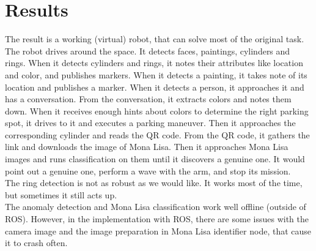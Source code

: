 \documentclass[a4paper,
  twoside, %
  headlines=2.1 %
  ]{scrartcl}
\begin{document}
\newpage

\section{Results}
The result is a working (virtual) robot, that can solve most of the original task. 
\\
The robot drives around the space. It detects faces, paintings, cylinders and rings. When it detects cylinders and rings, it notes their attributes like location and color, and publishes markers. When it detects a painting, it takes note of its location and publishes a marker. When it detects a person, it approaches it and has a conversation. From the conversation, it extracts colors and notes them down. When it receives enough hints about colors to determine the right parking spot, it drives to it and executes a parking maneuver. Then it approaches the corresponding cylinder and reads the QR code. From the QR code, it gathers the link and downloads the image of Mona Lisa. Then it approaches Mona Lisa images and runs classification on them until it discovers a genuine one. It would point out a genuine one, perform a wave with the arm, and stop its mission.
\\
The ring detection is not as robust as we would like. It works most of the time, but sometimes it still acts up. 
\\
The anomaly detection and Mona Lisa classification work well offline (outside of ROS). However, in the implementation with ROS, there are some issues with the camera image and the image preparation in Mona Lisa identifier node, that cause it to crash often. 


\newpage
\end{document}
